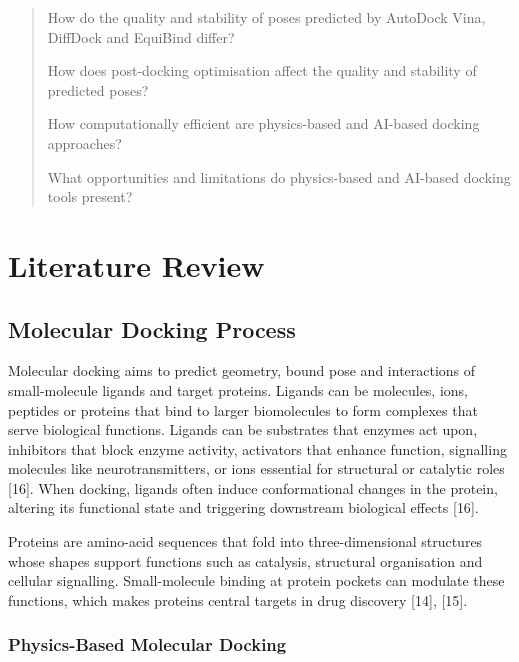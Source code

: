 \begin{quote}
How do the quality and stability of poses predicted by AutoDock Vina, DiffDock and EquiBind differ?

How does post-docking optimisation affect the quality and stability of predicted poses?

How computationally efficient are physics-based and AI-based docking approaches?

What opportunities and limitations do physics-based and AI-based docking tools present?
\end{quote}

\hypertarget{literature-review}{%
\chapter{\texorpdfstring{Literature Review }{Literature Review }}\label{literature-review}}

\hypertarget{molecular-docking-process}{%
\section{Molecular Docking Process}\label{molecular-docking-process}}

Molecular docking aims to predict geometry, bound pose and interactions of small-molecule ligands and target proteins. Ligands can be molecules, ions, peptides or proteins that bind to larger biomolecules to form complexes that serve biological functions. Ligands can be substrates that enzymes act upon, inhibitors that block enzyme activity, activators that enhance function, signalling molecules like neurotransmitters, or ions essential for structural or catalytic roles {[}16{]}. When docking, ligands often induce conformational changes in the protein, altering its functional state and triggering downstream biological effects {[}16{]}.

Proteins are amino-acid sequences that fold into three-dimensional structures whose shapes support functions such as catalysis, structural organisation and cellular signalling. Small-molecule binding at protein pockets can modulate these functions, which makes proteins central targets in drug discovery {[}14{]}, {[}15{]}.

\hypertarget{physics-based-molecular-docking}{%
\subsection{Physics-Based Molecular Docking}\label{physics-based-molecular-docking}}

